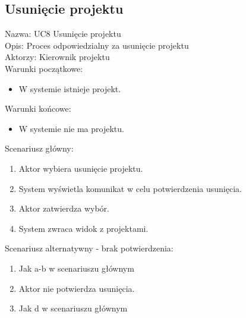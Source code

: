 \subsection{Usunięcie projektu}
\begin{adjustwidth}{5em}{0pt}
Nazwa: UC8 Usunięcie projektu\\
Opis: Proces odpowiedzialny za usunięcie projektu\\
Aktorzy: Kierownik projektu \\
Warunki początkowe:
\begin{itemize}
\item W systemie istnieje projekt.
\end{itemize}
Warunki końcowe:
\begin{itemize}
\item W systemie nie ma projektu.
\end{itemize}
Scenariusz główny:
\begin{enumerate}
\item Aktor wybiera usunięcie projektu.
\item System wyświetla komunikat w celu potwierdzenia usunięcia.
\item Aktor zatwierdza wybór.
\item System zwraca widok z projektami.
\end{enumerate}
Scenariusz alternatywny - brak potwierdzenia: 
\begin{enumerate}
\item Jak a-b w scenariuszu głównym
\item Aktor nie potwierdza usunięcia.
\item Jak d w scenariuszu głównym
\end{enumerate}
\end{adjustwidth}


